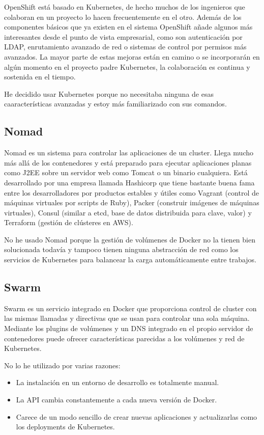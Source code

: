 OpenShift está basado en Kubernetes, de hecho muchos de los ingenieros que colaboran en un proyecto lo hacen frecuentemente en el otro. Además de los componentes básicos que ya existen en el sistema OpenShift añade algunos más interesantes desde el punto de vista empresarial, como son autenticación por LDAP, enrutamiento avanzado de red o sistemas de control por permisos más avanzados. La mayor parte de estas mejoras están en camino o se incorporarán en algún momento en el proyecto padre Kubernetes, la colaboración es continua y sostenida en el tiempo.

He decidido usar Kubernetes porque no necesitaba ninguna de esas caaracterísticas avanzadas y estoy más familiarizado con sus comandos.

\subsection{Nomad}
\label{subsec:k8s-alternativas-nomad}

Nomad\cite{nomad} es un sistema para controlar las aplicaciones de un cluster. Llega mucho más allá de los contenedores y está preparado para ejecutar aplicaciones planas como J2EE sobre un servidor web como Tomcat o un binario cualquiera. Está desarrollado por una empresa llamada Hashicorp\cite{hashicorp} que tiene bastante buena fama entre los desarrolladores por productos estables y útiles como Vagrant (control de máquinas virtuales por scripts de Ruby), Packer (construir imágenes de máquinas virtuales), Consul (similar a etcd, base de datos distribuida para clave, valor) y Terraform (gestión de clústeres en AWS).

No he usado Nomad porque la gestión de volúmenes de Docker no la tienen bien solucionada todavía\cite{nomdadvolumesbug} y tampoco tienen ninguna abstracción de red como los servicios de Kubernetes para balancear la carga automáticamente entre trabajos.

\subsection{Swarm}
\label{subsec:k8s-alternativas-swarm}

Swarm\cite{swarm} es un servicio integrado en Docker que proporciona control de cluster con las mismas llamadas y directivas que se usan para controlar una sola máquina. Mediante los plugins de volúmenes y un DNS integrado en el propio servidor de contenedores puede ofrecer características parecidas a los volúmenes y red de Kubernetes.

No lo he utilizado por varias razones:
\begin{itemize}
  \item La instalación en un entorno de desarrollo es totalmente manual.
  \item La API cambia constantemente a cada nueva versión de Docker.
  \item Carece de un modo sencillo de crear nuevas aplicaciones y actualizarlas como los deployments de Kubernetes.
\end{itemize}
